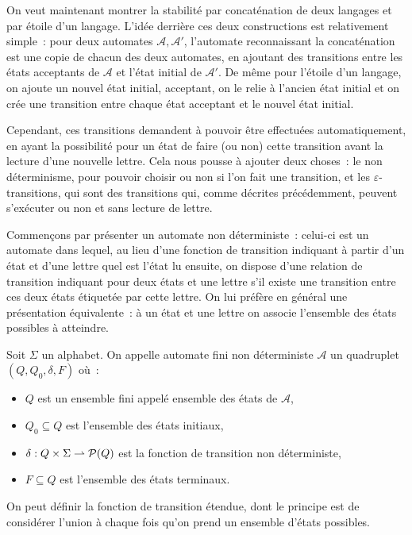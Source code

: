 On veut maintenant montrer la stabilité par concaténation de deux langages et
par étoile d'un langage. L'idée derrière ces deux constructions est relativement
simple~: pour deux automates $\mathcal A,\mathcal A'$, l'automate reconnaissant
la concaténation est une copie de chacun des deux automates, en ajoutant des
transitions entre les états acceptants de $\mathcal A$ et l'état initial de
$\mathcal A'$. De même pour l'étoile d'un langage, on ajoute un nouvel état
initial, acceptant, on le relie à l'ancien état initial et on crée une
transition entre chaque état acceptant et le nouvel état initial.

Cependant, ces transitions demandent à pouvoir être effectuées automatiquement,
en ayant la possibilité pour un état de faire (ou non) cette transition avant
la lecture d'une nouvelle lettre. Cela nous pousse à ajouter deux choses~: le
non déterminisme, pour pouvoir choisir ou non si l'on fait une transition, et
les $\varepsilon$-transitions, qui sont des transitions qui, comme décrites
précédemment, peuvent s'exécuter ou non et sans lecture de lettre.

Commençons par présenter un automate non déterministe~: celui-ci est un automate
dans lequel, au lieu d'une fonction de transition indiquant à partir d'un état
et d'une lettre quel est l'état lu ensuite, on dispose d'une relation de
transition indiquant pour deux états et une lettre s'il existe une transition
entre ces deux états étiquetée par cette lettre. On lui préfère en général une
présentation équivalente~: à un état et une lettre on associe l'ensemble des
états possibles à atteindre.

\begin{definition}
  Soit $\Sigma$ un alphabet. On appelle automate fini non déterministe
  $\mathcal A$ un quadruplet $(Q,Q_0,\delta,F)$ où~:
  \begin{itemize}
  \item $Q$ est un ensemble fini appelé ensemble des états de $\mathcal A$,
  \item $Q_0\subseteq Q$ est l'ensemble des états initiaux,
  \item $\delta : Q\times \Sigma \rightharpoonup \mathcal{P}(Q)$ est la fonction de
    transition non déterministe,
  \item $F\subseteq Q$ est l'ensemble des états terminaux.
  \end{itemize}
\end{definition}

On peut définir la fonction de transition étendue, dont le principe est de
considérer l'union à chaque fois qu'on prend un ensemble d'états possibles.

